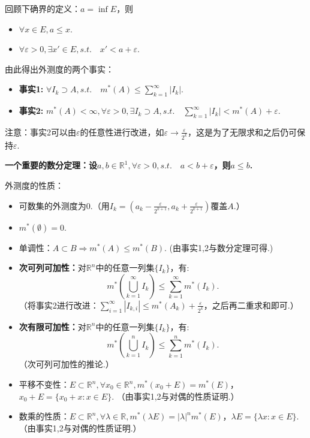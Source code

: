 \documentclass[bwprint, withoutpreface]{cumcmthesis}
\begin{document}
回顾下确界的定义：$a = \inf E$，则
\begin{itemize}[itemindent=2em]
	\item $\forall x \in E, a \leqslant x$.
	\item $\forall \varepsilon > 0, \exists x' \in E, s.t. \quad x' < a + \varepsilon$.
\end{itemize}

由此得出外测度的两个事实：
\begin{itemize}[itemindent=2em]
	\item \textbf{事实1:} $\forall {I_k} \supset A, s.t. \quad m^*(A) \leqslant \sum_{k = 1}^{\infty}|I_k|$.
	\item \textbf{事实2:} $m^*(A) < \infty, \forall \varepsilon > 0, \exists {I_k} \supset A, s.t. \quad \sum_{k = 1}^{\infty}|I_k| < m^*(A) + \varepsilon$.
\end{itemize}

注意：事实2可以由$\varepsilon$的任意性进行改进，如$\varepsilon \to \frac{\varepsilon}{2^k}$，这是为了无限求和之后仍可保持$\varepsilon$.

\textbf{一个重要的数分定理：设$a, b \in \mathbb{R}^1, \forall \varepsilon > 0, s.t. \quad a < b + \varepsilon$，则$a \leqslant b$.}

外测度的性质：
\begin{itemize}[itemindent=2em]
	\item 可数集的外测度为$0$.（用$I_k = (a_k - \frac{\varepsilon}{2^{k + 1}}, a_k + \frac{\varepsilon}{2^{k + 1}})$覆盖$A$.）
	\item $m^*(\emptyset) = 0$.
	\item 单调性：$A \subset B \Rightarrow m^*(A) \leqslant m^*(B)$. (由事实1,2与数分定理可得.)
	\item \textbf{次可列可加性：}对$\mathbb{R}^n$中的任意一列集$\{I_k\}$，有:
	\begin{equation*}
		m^*(\bigcup_{k = 1}^{\infty}{I_k}) \leqslant \sum_{k = 1}^{\infty}{m^*(I_k)}.
	\end{equation*}（将事实2进行改进：$\sum_{i = 1}^{\infty}|I_{k, i}| \leqslant m^*(A_k) + \frac{\varepsilon}{2^k}$，之后再二重求和即可.）
	\item \textbf{次有限可加性：}对$\mathbb{R}^n$中的任意一列集$\{I_k\}$，有:
	\begin{equation*}
		m^*(\bigcup_{k = 1}^{n}{I_k}) \leqslant \sum_{k = 1}^{n}{m^*(I_k)}.
	\end{equation*}（次可列可加性的推论.）
	\item 平移不变性：$E \subset \mathbb{R}^n, \forall x_0 \in \mathbb{R}^n, m^*(x_0 + E) = m^*(E)$，$x_0 + E = \{x_0 + x: x \in E\}.$ （由事实1,2与对偶的性质证明.）
	\item 数乘的性质：$E \subset \mathbb{R}^n, \forall \lambda \in \mathbb{R}, m^*(\lambda E) = |\lambda|^n m^*(E)$，$\lambda E = \{\lambda x: x \in E\}.$ （由事实1,2与对偶的性质证明.）
\end{itemize}
\end{document}
